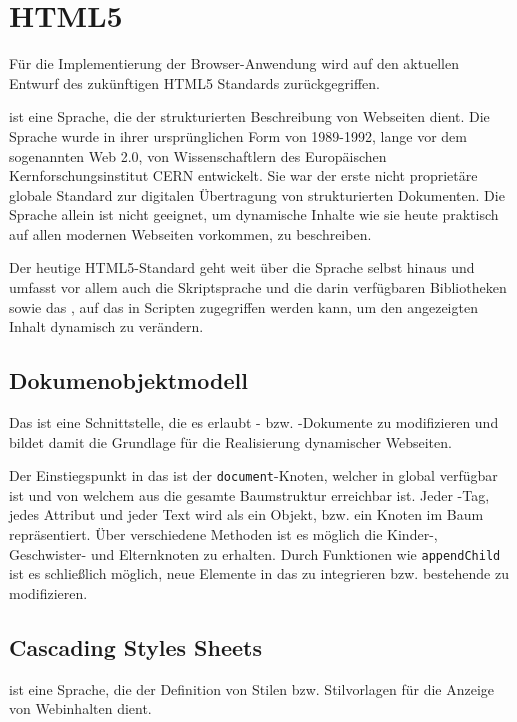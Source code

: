 \section{HTML5}

Für die Implementierung der Browser-Anwendung wird auf den aktuellen Entwurf des zukünftigen HTML5
Standards zurückgegriffen.

 ist eine Sprache, die der strukturierten Beschreibung von Webseiten dient. Die Sprache
wurde in ihrer ursprünglichen Form  von 1989-1992, lange vor dem sogenannten Web 2.0, von
Wissenschaftlern des Europäischen Kernforschungsinstitut CERN entwickelt. Sie war der erste nicht
proprietäre globale Standard zur digitalen Übertragung von strukturierten  Dokumenten. Die Sprache
 allein ist nicht geeignet, um dynamische Inhalte  wie sie heute praktisch auf allen
modernen Webseiten vorkommen, zu beschreiben. 

Der heutige HTML5-Standard geht weit über die Sprache  selbst hinaus und  umfasst vor
allem auch die Skriptsprache  und die darin verfügbaren Bibliotheken sowie das ,
auf das in  Scripten zugegriffen werden kann, um den angezeigten Inhalt dynamisch zu verändern.
\cite{html5}

\subsection{Dokumenobjektmodell}

Das \textit{} ist eine Schnittstelle, die es erlaubt - bzw. -Dokumente zu
modifizieren und bildet damit die Grundlage für die Realisierung dynamischer Webseiten.

Der Einstiegspunkt in das  ist der \texttt{document}-Knoten, welcher in 
global verfügbar ist und von welchem aus die gesamte Baumstruktur erreichbar ist. Jeder
-Tag, jedes Attribut und jeder Text wird als ein Objekt, bzw. ein Knoten im Baum
repräsentiert. Über verschiedene Methoden ist es möglich die Kinder-, Geschwister- und Elternknoten
zu erhalten. Durch Funktionen wie \texttt{appendChild} ist es schließlich möglich, neue Elemente
in das  zu integrieren bzw. bestehende zu modifizieren. \cite{dom}

\subsection{Cascading Styles Sheets}

 ist eine Sprache, die der Definition von  Stilen bzw. Stilvorlagen für die Anzeige von
Webinhalten dient.

